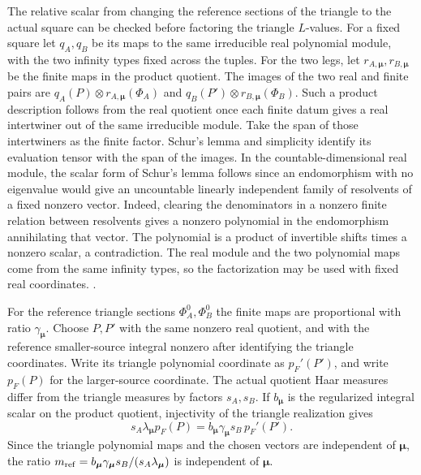 The relative scalar from changing the reference sections of
the triangle to the actual square can be checked before
factoring the triangle \(L\)-values. For a fixed square let
\(q_A,q_B\) be its maps to the same irreducible real polynomial
module, with the two infinity types fixed across the tuples.
For the two legs, let \(r_{A,\boldsymbol\mu},r_{B,\boldsymbol\mu}\)
be the finite maps in the product quotient. The images of
the two real and finite pairs are
\(q_A(P)\otimes r_{A,\boldsymbol\mu}(\Phi_A)\) and
\(q_B(P')\otimes r_{B,\boldsymbol\mu}(\Phi_B)\).
Such a product description follows from the real quotient
once each finite datum gives a real intertwiner out of the
same irreducible module. Take the span of those intertwiners
as the finite factor. Schur's lemma and simplicity identify
its evaluation tensor with the span of the images. In the
countable-dimensional real module, the scalar form of Schur's
lemma follows since an endomorphism with no eigenvalue would
give an uncountable linearly independent family of resolvents
of a fixed nonzero vector. Indeed, clearing the denominators
in a nonzero finite relation between resolvents gives a
nonzero polynomial in the endomorphism annihilating that
vector. The polynomial is a product of invertible shifts
times a nonzero scalar, a contradiction. The real module and the two
polynomial maps come from the same infinity types, so the
factorization may be used with fixed real coordinates.
.

For the reference triangle sections \(\Phi_A^0,\Phi_B^0\)
the finite maps are proportional with ratio
\(\gamma_{\boldsymbol\mu}\). Choose \(P,P'\) with the same
nonzero real quotient, and with the reference smaller-source
integral nonzero after identifying the triangle coordinates.
Write its triangle polynomial coordinate as \(p_F'(P')\),
and write \(p_F(P)\) for the larger-source coordinate.
The actual quotient Haar measures differ from the triangle
measures by factors \(s_A,s_B\). If \(b_{\boldsymbol\mu}\)
is the regularized integral scalar on the product quotient,
injectivity of the triangle realization gives
\[
 s_A\lambda_{\boldsymbol\mu}p_F(P)
       =b_{\boldsymbol\mu}\gamma_{\boldsymbol\mu}s_B\,p_F'(P').
\]
Since the triangle polynomial maps and the chosen vectors
are independent of \(\boldsymbol\mu\), the ratio
\(m_{\rm ref}=b_{\boldsymbol\mu}\gamma_{\boldsymbol\mu}s_B/
             (s_A\lambda_{\boldsymbol\mu})\)
is independent of \(\boldsymbol\mu\).

